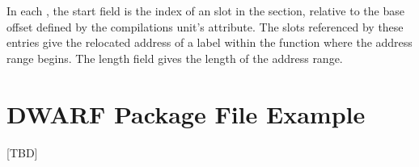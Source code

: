 In each \DWLLEstartlengthentry{}, the start field is the index
of an slot in the \dotdebugaddr{} section, relative to the base
offset defined by the compilations unit's \DWATaddrbase{}
attribute. The \dotdebugaddr{} slots referenced by these entries give
the relocated address of a label within the function where the
address range begins. The length field gives the length of the
address range.

\clearpage
\section{DWARF Package File Example}
\label{app:dwarfpackagefileexample}
[TBD]
